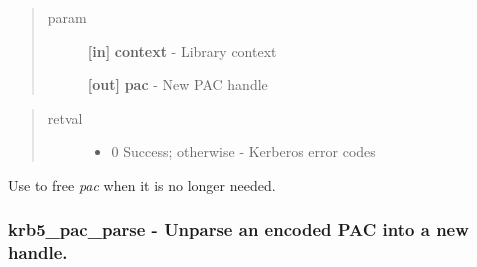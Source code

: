 \documentclass[letterpaper,10pt,english]{sphinxmanual}
\begin{document}
\begin{quote}\begin{description}
\item[{param}] \leavevmode
\textbf{{[}in{]}} \textbf{context} - Library context

\textbf{{[}out{]}} \textbf{pac} - New PAC handle

\end{description}\end{quote}
\begin{quote}\begin{description}
\item[{retval}] \leavevmode\begin{itemize}
\item {} 
0   Success; otherwise - Kerberos error codes

\end{itemize}

\end{description}\end{quote}

Use {\hyperref[appdev/refs/api/krb5_pac_free:c.krb5_pac_free]{}} to free \emph{pac} when it is no longer needed.


\subsubsection{krb5\_pac\_parse -  Unparse an encoded PAC into a new handle.}
\label{appdev/refs/api/krb5_pac_parse:krb5-pac-parse-unparse-an-encoded-pac-into-a-new-handle}\label{appdev/refs/api/krb5_pac_parse::doc}

\begin{fulllineitems}
\label{appdev/refs/api/krb5_pac_parse:c.krb5_pac_parse}
\end{fulllineitems}
\end{document}
